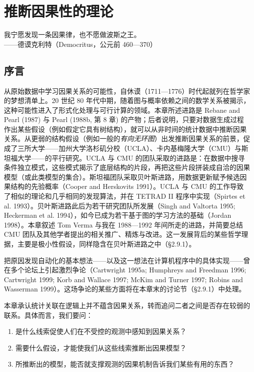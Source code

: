 \chapter{推断因果性的理论}

\begin{flushright}
\kaishu\small
我宁愿发现一条因果律，也不愿做波斯之王。\\[2pt]
——德谟克利特（Democritus，公元前 460—370）
\end{flushright}

\section*{序言}

从原始数据中学习因果关系的可能性，自休谟（1711—1776）时代起就列在哲学家的梦想清单上。20 世纪 80 年代中期，随着图与概率依赖之间的数学关系被揭示，这种可能性进入了形式化处理与可行计算的领域。本章所述进路是 Rebane and Pearl (1987) 与 Pearl (1988b, 第 8 章) 的产物；后者说明，只要对数据生成过程作出某些假设（例如假定它具有树结构），就可以从非时间的统计数据中推断因果关系。从更弱的结构假设（例如一般的\emph{有向无环图}）出发推断因果关系的前景，促成了三所大学——加州大学洛杉矶分校（UCLA）、卡内基梅隆大学（CMU）与斯坦福大学——的平行研究。UCLA 与 CMU 的团队采取的进路是：在数据中搜寻条件独立模式，这些模式揭示了底层结构的片段，再把这些片段拼装成自洽的因果模型（或此类模型的集合）。斯坦福团队采取贝叶斯进路，用数据更新赋予候选因果结构的先验概率（Cooper and Herskovits 1991）。UCLA 与 CMU 的工作导致了相似的理论和几乎相同的发现算法，并在 TETRAD II 程序中实现（Spirtes et al. 1993）。贝叶斯进路此后为若干研究团队所发展（Singh and Valtorta 1995; Heckerman et al. 1994），如今已成为若干基于图的学习方法的基础（Jordan 1998）。本章叙述 Tom Verma 与我在 1988—1992 年间所走的进路，并简要总结 CMU 团队及其他学者提出的相关推广、精炼与改进。这一发展背后的某些哲学理据，主要是极小性假设，同样隐含在贝叶斯进路之中（\S 2.9.1）。

把原因发现自动化的基本想法——以及这一想法在计算机程序中的具体实现——曾在多个论坛上引起激烈争论（Cartwright 1995a; Humphreys and Freedman 1996; Cartwright 1999; Korb and Wallace 1997; McKim and Turner 1997; Robins and Wasserman 1999）。这场争论的某些方面将在本章末的讨论节（\S 2.9.1）中处理。

本章承认统计关联在逻辑上并不蕴含因果关系，转而追问二者之间是否存在较弱的联系。具体而言，我们要问：
\begin{enumerate}[label=\arabic*.]
\item 是什么线索促使人们在不受控的观测中感知到因果关系？
\item 需要什么假设，才能使我们从这些线索推断出因果模型？
\item 所推断出的模型，能否就支撑观测的因果机制告诉我们某些有用的东西？
\end{enumerate}

